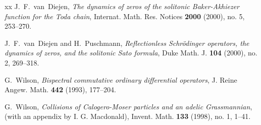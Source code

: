 \documentclass[11pt,reqno]{amsart}
\theoremstyle{definition}
\numberwithin{equation}{section}
\begin{document}
\begin{thebibliography}{xx}
 J.~F.~van~Diejen, {\em The dynamics of zeros of the solitonic 
Baker-Akhiezer function for the Toda chain}, 
Internat. Math. Res. Notices {\bf 2000} (2000), no. 5, 253--270.

 J.~F.~van~Diejen and  H.~Puschmann, 
{\em Reflectionless Schr\"odinger operators, the dynamics of zeros, and the 
solitonic Sato formula}, Duke Math. J. {\bf 104} (2000), no. 2, 269--318.

 G.~Wilson, {\em Bispectral commutative ordinary differential 
operators}, J. Reine Angew. Math. {\bf 442} (1993), 177--204.

 G.~Wilson, {\em Collisions of Calogero-Moser particles and an 
adelic Grassmannian}, (with an appendix by I. G. Macdonald),  
Invent. Math. {\bf 133} (1998), no. 1, 1--41.



\end{thebibliography}
\end{document}
